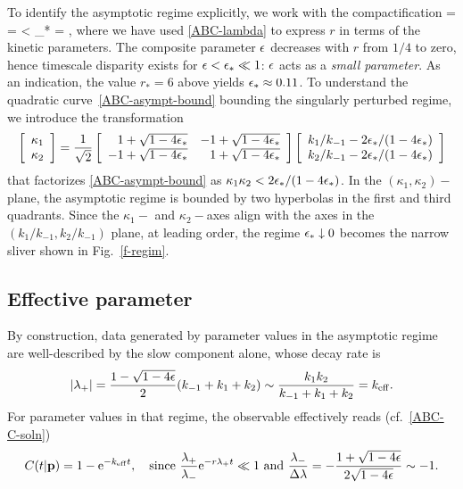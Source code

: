 To identify the asymptotic regime explicitly, we work with the compactification
%
\be
 \eps
=
=
<
 \eps_*
=
 ,
\label{ABC-asympt-bound}
\ee
%
where we have used \eqref{ABC-lambda} to express $r$ in terms of the kinetic parameters.
The composite parameter $\epsilon$ decreases with $r$ from $1/4$ to zero,
hence timescale disparity exists for $\epsilon < \epsilon_* \ll 1$: $\epsilon$ acts as a \emph{small parameter}.
As an indication, the value $r_*=6$ above yields $\epsilon_* \approx 0.11$.
To understand the quadratic curve~\eqref{ABC-asympt-bound} bounding the singularly perturbed regime,
we introduce the transformation
%
\[
\left[\begin{array}{c}
 \kappa_1 \\ \kappa_2
\end{array}\right]
=
 \frac{1}{\sqrt2}
%
\left[\begin{array}{rr}
 1+\sqrt{1-4\eps_*} & -1+\sqrt{1-4\eps_*} \\ -1+\sqrt{1-4\eps_*} & 1+\sqrt{1-4\eps_*}
\end{array}\right]
%
\left[\begin{array}{c}
 k_1/k_{-1} - 2 \eps_*/(1 - 4 \eps_*) \\ k_2/k_{-1} - 2 \eps_*/(1 - 4 \eps_*)
\end{array}\right]
\]
%
that factorizes \eqref{ABC-asympt-bound} as $\kappa_1 \kappa_2 < 2 \epsilon_*/(1 - 4 \epsilon_*)$.
In the $(\kappa_1,\kappa_2)-$plane, the asymptotic regime is bounded by two hyperbolas in the first and third quadrants.
Since the $\kappa_1-$ and $\kappa_2-$axes align with the axes in the $(k_1/k_{-1},k_2/k_{-1})$ plane, at leading order,
the regime $\epsilon_* \downarrow 0$ becomes the narrow sliver shown in Fig.~\ref{f-regim}.\\
%
\subsection{Effective parameter}
%
By construction, data generated by parameter values in the asymptotic
regime are well-described by the slow component alone, whose decay
rate is
%
\[
 \vert \lambda_+ \vert
=
 \frac{1 - \sqrt{1-4\epsilon}}{2}
 (k_{-1}+k_1+k_2)
\sim
 \frac{k_1 k_2}{k_{-1}+k_1+k_2}
=
 k_\mathrm{eff} .
\]
%
For parameter values in that regime, the observable effectively reads (cf.~\eqref{ABC-C-soln})
%
\[
 C(t \vert \mathbf{p})
=
 1
-
 \mathrm{e}^{-k_\mathrm{eff} t} ,
\quad\mbox{since}\
 \frac{\lambda_+}{\lambda_-}
 \mathrm{e}^{-r \lambda_+ t}
\ll
 1
\ \mbox{and} \
 \frac{\lambda_-}{\Delta\lambda}
=
-
\frac{
 1 + \sqrt{1 - 4 \epsilon}
}{
 2 \sqrt{1 - 4 \epsilon}
}
\sim
 -1 .
\]
%

